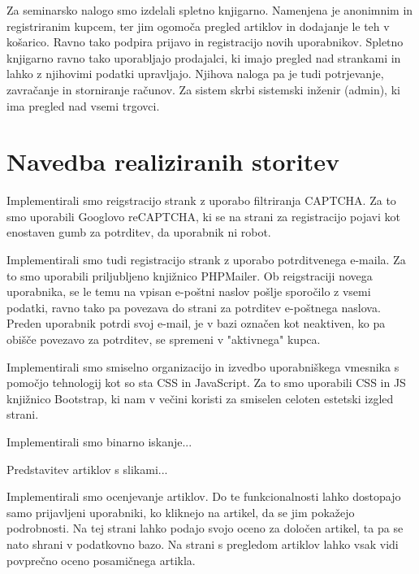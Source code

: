 \documentclass[a4paper,12pt]{report}
\begin{document}
Za seminarsko nalogo smo izdelali spletno knjigarno. Namenjena je anonimnim in registriranim kupcem, ter jim ogomoča pregled artiklov in dodajanje le teh v košarico. Ravno tako podpira prijavo in registracijo novih uporabnikov. Spletno knjigarno ravno tako uporabljajo prodajalci, ki imajo pregled nad strankami in lahko z njihovimi podatki upravljajo. Njihova naloga pa je tudi potrjevanje, zavračanje in storniranje računov. Za sistem skrbi sistemski inženir (admin), ki ima pregled nad vsemi trgovci. 

\chapter{Navedba realiziranih storitev}

Implementirali smo reigstracijo strank z uporabo filtriranja CAPTCHA. Za to smo uporabili Googlovo reCAPTCHA, ki se na strani za registracijo pojavi kot enostaven gumb za potrditev, da uporabnik ni robot. \newline 

Implementirali smo tudi registracijo strank z uporabo potrditvenega e-maila. Za to smo uporabili priljubljeno knjižnico PHPMailer. Ob reigstraciji novega uporabnika, se le temu na vpisan e-poštni naslov pošlje sporočilo z vsemi podatki, ravno tako pa povezava do strani za potrditev e-poštnega naslova. Preden uporabnik potrdi svoj e-mail, je v bazi označen kot neaktiven, ko pa obišče povezavo za potrditev, se spremeni v "aktivnega" kupca. \newline

Implementirali smo smiselno organizacijo in izvedbo uporabniškega vmesnika s pomočjo tehnologij kot so sta CSS in JavaScript. Za to smo uporabili CSS in JS knjižnico Bootstrap, ki nam v večini koristi za smiselen celoten estetski izgled strani. 

Implementirali smo binarno iskanje... \newline

Predstavitev artiklov s slikami... \newline

Implementirali smo ocenjevanje artiklov. Do te funkcionalnosti lahko dostopajo samo prijavljeni uporabniki, ko kliknejo na artikel, da se jim pokažejo podrobnosti. Na tej strani lahko podajo svojo oceno za določen artikel, ta pa se nato shrani v podatkovno bazo. Na strani s pregledom artiklov lahko vsak vidi povprečno oceno posamičnega artikla. \newline
\end{document}
